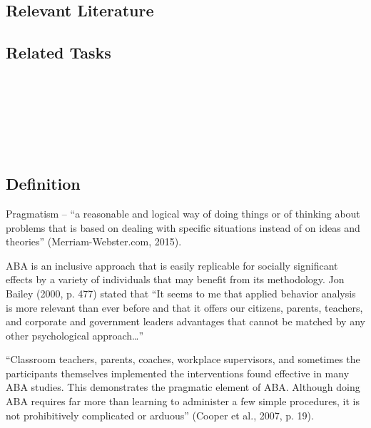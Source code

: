 \subsection{Relevant Literature}
\begin{refsection}
\nocite{test,alang2017police,clayton2018black}
\printbibliography[heading=none]
\end{refsection}
%
\subsection{Related Tasks}
\fourFKOne{}\\ %
\fourFKTwo{}\\ %
\fourFKThree{}\\%
\fourFKFour{}\\%
\fourFKSix{}\\%
%
%
%
%
%
\section{\fourFKSix{}}
\subsection{Definition}
Pragmatism – ``a reasonable and logical way of doing things or of thinking about problems that is based on dealing with specific situations instead of on ideas and theories'' (Merriam-Webster.com, 2015).

ABA is an inclusive approach that is easily replicable for socially significant effects by a variety of individuals that may benefit from its methodology. Jon Bailey (2000, p. 477) stated that ``It seems to me that applied behavior analysis is more relevant than ever before and that it offers our citizens, parents, teachers, and corporate and government leaders advantages that cannot be matched by any other psychological approach…'' 

``Classroom teachers, parents, coaches, workplace supervisors, and sometimes the participants themselves implemented the interventions found effective in many ABA studies. This demonstrates the pragmatic element of ABA. Although doing ABA requires far more than learning to administer a few simple procedures, it is not prohibitively complicated or arduous'' (Cooper et al., 2007, p. 19). 

